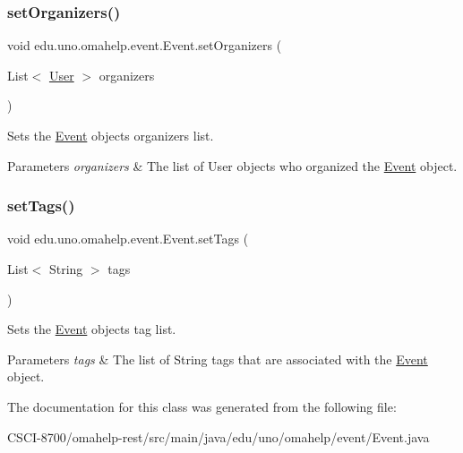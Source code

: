 \subsubsection{\texorpdfstring{set\+Organizers()}{setOrganizers()}}
{\footnotesize\ttfamily void edu.\+uno.\+omahelp.\+event.\+Event.\+set\+Organizers (\begin{DoxyParamCaption}\item[{List$<$ \mbox{\hyperlink{classedu_1_1uno_1_1omahelp_1_1user_1_1_user}{User}} $>$}]{organizers }\end{DoxyParamCaption})}

Sets the \mbox{\hyperlink{classedu_1_1uno_1_1omahelp_1_1event_1_1_event}{Event}} object\textquotesingle{}s organizers list.


\begin{DoxyParams}{Parameters}
{\em organizers} & The list of User objects who organized the \mbox{\hyperlink{classedu_1_1uno_1_1omahelp_1_1event_1_1_event}{Event}} object. \\
\hline
\end{DoxyParams}
\mbox{\label{classedu_1_1uno_1_1omahelp_1_1event_1_1_event_a3d0ad2bf880727a1b4eb0fdcdffa3439}} 
\subsubsection{\texorpdfstring{set\+Tags()}{setTags()}}
{\footnotesize\ttfamily void edu.\+uno.\+omahelp.\+event.\+Event.\+set\+Tags (\begin{DoxyParamCaption}\item[{List$<$ String $>$}]{tags }\end{DoxyParamCaption})}

Sets the \mbox{\hyperlink{classedu_1_1uno_1_1omahelp_1_1event_1_1_event}{Event}} object\textquotesingle{}s tag list.


\begin{DoxyParams}{Parameters}
{\em tags} & The list of String tags that are associated with the \mbox{\hyperlink{classedu_1_1uno_1_1omahelp_1_1event_1_1_event}{Event}} object. \\
\hline
\end{DoxyParams}


The documentation for this class was generated from the following file\+:\begin{DoxyCompactItemize}
\item 
C\+S\+C\+I-\/8700/omahelp-\/rest/src/main/java/edu/uno/omahelp/event/Event.\+java\end{DoxyCompactItemize}
